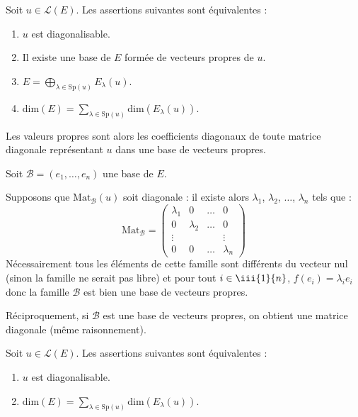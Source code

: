 \documentclass[french,11pt,twoside]{VcCours}
\begin{document}
\begin{Theoreme}{} Soit $u \in \mathcal{L}(E)$. Les assertions suivantes sont équivalentes : 

\begin{enumerate}
\item $u$ est diagonalisable.
\item Il existe une base de $E$ formée de vecteurs propres de $u$.
\item $E = \bigoplus_{\lambda \in \textrm{Sp}(u)} E_{\lambda}(u)$.
\item $\textrm{dim}(E) = \sum_{\lambda \in \textrm{Sp}(u)} \textrm{dim}(E_{\lambda}(u))$.
\end{enumerate}
Les valeurs propres sont alors les coefficients diagonaux de toute matrice diagonale représentant $u$ dans une base de vecteurs propres.
\end{Theoreme}
%
\begin{Demonstration}{} 

\newpage

\vspace*{5cm}
Soit $\mathcal{B}=(e_1, \ldots, e_n)$ une base de $E$.

%
Supposons que $\textrm{Mat}_{\mathcal{B}}(u)$ soit diagonale : il existe alors $\lambda_1$, $\lambda_2$, $\ldots$, $\lambda_n$ tels que :
$$ \textrm{Mat}_{\mathcal{B}} = \begin{pmatrix}
\lambda_1 & 0 & \ldots & 0 \\
0 & \lambda_2 & \ldots & 0 \\
\vdots & & & \vdots \\
0 & 0 & \ldots & \lambda_n
\end{pmatrix}$$
Nécessairement tous les éléments de cette famille sont différents du vecteur nul (sinon la famille ne serait pas libre) et pour tout $i \in \iii{1}{n}$, $f(e_i) = \lambda_i e_i$ donc la famille $\mathcal{B}$ est bien une base de vecteurs propres.

%
Réciproquement, si $\mathcal{B}$ est une base de vecteurs propres, on obtient une matrice diagonale (même raisonnement).
\end{Demonstration}

\begin{Theoreme}{} Soit $u \in \mathcal{L}(E)$. Les assertions suivantes sont équivalentes :

\begin{enumerate}
\item $u$ est diagonalisable.
\item $\textrm{dim}(E) = \sum_{\lambda \in \textrm{Sp}(u)} \textrm{dim}(E_{\lambda}(u))$.
\end{enumerate}
\end{Theoreme}
\end{document}
